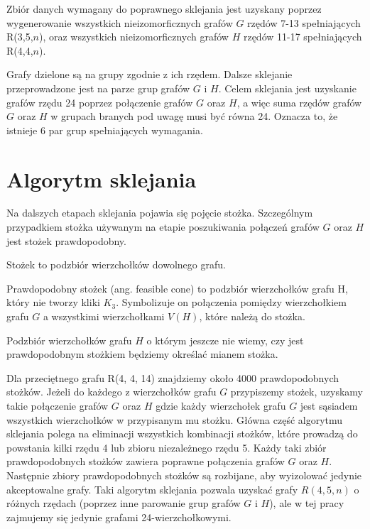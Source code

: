 Zbiór danych wymagany do poprawnego sklejania jest uzyskany poprzez wygenerowanie wszystkich nieizomorficznych grafów $G$ rzędów 7-13 spełniających R(3,5,$n$), oraz wszystkich nieizomorficznych grafów $H$ rzędów 11-17 spełniających R(4,4,$n$).

Grafy dzielone są na grupy zgodnie z ich rzędem. Dalsze sklejanie przeprowadzone jest na parze grup grafów $G$ i $H$. Celem sklejania jest uzyskanie grafów rzędu 24 poprzez połączenie grafów $G$ oraz $H$, a więc suma rzędów grafów $G$ oraz $H$ w grupach branych pod uwagę musi być równa 24. Oznacza to, że istnieje 6 par grup spełniających wymagania.

\section{Algorytm sklejania}

Na dalszych etapach sklejania pojawia się pojęcie stożka. Szczególnym przypadkiem stożka używanym na etapie poszukiwania połączeń grafów $G$ oraz $H$ jest stożek prawdopodobny.

\begin{definition} Stożek to podzbiór wierzchołków dowolnego grafu.
\end{definition}

\begin{definition}
Prawdopodobny stożek (ang. feasible cone) to podzbiór wierzchołków grafu H, który nie tworzy kliki $K_3$\cite{mainpaper}. Symbolizuje on połączenia pomiędzy wierzchołkiem grafu $G$ a wszystkimi wierzchołkami $V(H)$, które należą do stożka.
\end{definition}

Podzbiór wierzchołków grafu $H$ o którym jeszcze nie wiemy, czy jest prawdopodobnym stożkiem będziemy  określać mianem stożka.

Dla przeciętnego grafu R(4, 4, 14) znajdziemy około 4000 prawdopodobnych stożków. Jeżeli do każdego z wierzchołków grafu $G$ przypiszemy stożek, uzyskamy takie połączenie grafów $G$ oraz $H$ gdzie każdy wierzchołek grafu $G$ jest sąsiadem wszystkich wierzchołków w przypisanym mu stożku. Główna część algorytmu sklejania polega na eliminacji wszystkich kombinacji stożków, które prowadzą do powstania kilki rzędu 4 lub zbioru niezależnego rzędu 5. Każdy taki zbiór prawdopodobnych stożków zawiera poprawne połączenia grafów $G$ oraz $H$. Następnie zbiory prawdopodobnych stożków są rozbijane, aby wyizolować jedynie akceptowalne grafy. Taki algorytm sklejania pozwala uzyskać grafy $R(4,5,n)$ o różnych rzędach (poprzez inne parowanie grup grafów $G$ i $H$), ale w tej pracy zajmujemy się jedynie grafami 24-wierzchołkowymi.

